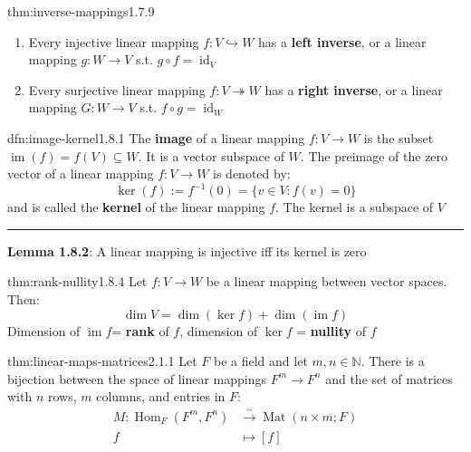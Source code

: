 \documentclass[landscape, 8pt]{extarticle}
\DeclareMathOperator{\im}{im}
\DeclareMathOperator{\Mat}{Mat}
\DeclareMathOperator{\Hom}{Hom}
\DeclareMathOperator{\id}{id}
\begin{document}
\begin{multicols}{3}
\vspace{-5pt}
\begin{thm}{thm:inverse-mappings}{1.7.9}
    \begin{enumerate}[leftmargin=*]
        \setlength\itemsep{0em}
        \item Every injective linear mapping $f : V \hookrightarrow W$ has a \textbf{left inverse}, or a linear mapping $g : W \to V$ s.t. $g \circ f = \id_{V}$
        \item Every surjective linear mapping $f : V \twoheadrightarrow W$ has a \textbf{right inverse}, or a linear mapping $G : W \to V$ s.t. $f \circ g = \id_{W}$
    \end{enumerate}
\end{thm}


\vspace{-5pt}
\begin{dfn}{dfn:image-kernel}{1.8.1}
    The \textbf{image} of a linear mapping $f : V \to W$ is the subset $\im(f) = f(V) \subseteq W$. It is a vector subspace of $W$. The preimage of the zero vector of a linear mapping $f : V \to W$ is denoted by:
    \[\ker(f) := f^{-1}(0) = \{v\in V : f(v) = 0\}\]
    and is called the \textbf{kernel} of the linear mapping $f$. The kernel is a subspace of $V$

    \noindent\rule{\textwidth}{0.2pt}
    \textbf{Lemma 1.8.2}: A linear mapping is injective iff its kernel is zero
\end{dfn}

\begin{thm}{thm:rank-nullity}{1.8.4}
    Let $f : V \to W$ be a linear mapping between vector spaces. Then:
    \[\dim V = \dim(\ker f) + \dim (\im f)\]
    Dimension of $\im f$= \textbf{rank} of $f$, dimension of $\ker f$ = \textbf{nullity} of $f$
\end{thm}

\begin{thm}{thm:linear-maps-matrices}{2.1.1}
    Let $F$ be a field and let $m,n\in \mathbb{N}$. There is a bijection between the space of linear mappings $F^{m}\to F^{n}$ and the set of matrices with $n$ rows, $m$ columns, and entries in $F$:
    \begin{align*}
        M : \Hom_{F}(F^{m}, F^{n}) &\xrightarrow{\sim} \Mat(n \times m; F)\\
        f &\mapsto [f]
    \end{align*}


\end{thm}
\end{multicols}
\end{document}
